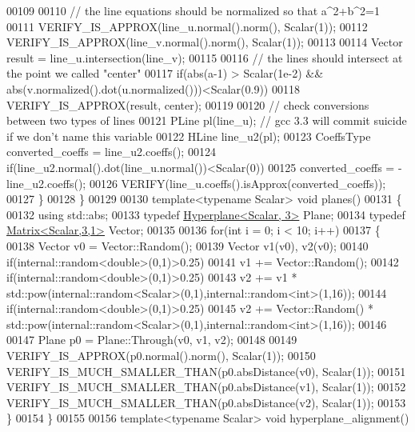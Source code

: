 \begin{DoxyCode}
00109 
00110     \textcolor{comment}{// the line equations should be normalized so that a^2+b^2=1}
00111     VERIFY\_IS\_APPROX(line\_u.normal().norm(), Scalar(1));
00112     VERIFY\_IS\_APPROX(line\_v.normal().norm(), Scalar(1));
00113 
00114     Vector result = line\_u.intersection(line\_v);
00115 
00116     \textcolor{comment}{// the lines should intersect at the point we called "center"}
00117     \textcolor{keywordflow}{if}(abs(a-1) > Scalar(1e-2) && abs(v.normalized().dot(u.normalized()))<Scalar(0.9))
00118       VERIFY\_IS\_APPROX(result, center);
00119 
00120     \textcolor{comment}{// check conversions between two types of lines}
00121     PLine pl(line\_u); \textcolor{comment}{// gcc 3.3 will commit suicide if we don't name this variable}
00122     HLine line\_u2(pl);
00123     CoeffsType converted\_coeffs = line\_u2.coeffs();
00124     \textcolor{keywordflow}{if}(line\_u2.normal().dot(line\_u.normal())<Scalar(0))
00125       converted\_coeffs = -line\_u2.coeffs();
00126     VERIFY(line\_u.coeffs().isApprox(converted\_coeffs));
00127   \}
00128 \}
00129 
00130 \textcolor{keyword}{template}<\textcolor{keyword}{typename} Scalar> \textcolor{keywordtype}{void} planes()
00131 \{
00132   \textcolor{keyword}{using} std::abs;
00133   \textcolor{keyword}{typedef} \hyperlink{group___geometry___module_class_eigen_1_1_hyperplane}{Hyperplane<Scalar, 3>} Plane;
00134   \textcolor{keyword}{typedef} \hyperlink{group___core___module}{Matrix<Scalar,3,1>} Vector;
00135 
00136   \textcolor{keywordflow}{for}(\textcolor{keywordtype}{int} i = 0; i < 10; i++)
00137   \{
00138     Vector v0 = Vector::Random();
00139     Vector v1(v0), v2(v0);
00140     \textcolor{keywordflow}{if}(internal::random<double>(0,1)>0.25)
00141       v1 += Vector::Random();
00142     \textcolor{keywordflow}{if}(internal::random<double>(0,1)>0.25)
00143       v2 += v1 * std::pow(internal::random<Scalar>(0,1),internal::random<int>(1,16));
00144     \textcolor{keywordflow}{if}(internal::random<double>(0,1)>0.25)
00145       v2 += Vector::Random() * std::pow(internal::random<Scalar>(0,1),internal::random<int>(1,16));
00146 
00147     Plane p0 = Plane::Through(v0, v1, v2);
00148 
00149     VERIFY\_IS\_APPROX(p0.normal().norm(), Scalar(1));
00150     VERIFY\_IS\_MUCH\_SMALLER\_THAN(p0.absDistance(v0), Scalar(1));
00151     VERIFY\_IS\_MUCH\_SMALLER\_THAN(p0.absDistance(v1), Scalar(1));
00152     VERIFY\_IS\_MUCH\_SMALLER\_THAN(p0.absDistance(v2), Scalar(1));
00153   \}
00154 \}
00155 
00156 \textcolor{keyword}{template}<\textcolor{keyword}{typename} Scalar> \textcolor{keywordtype}{void} hyperplane\_alignment()

\end{DoxyCode}
